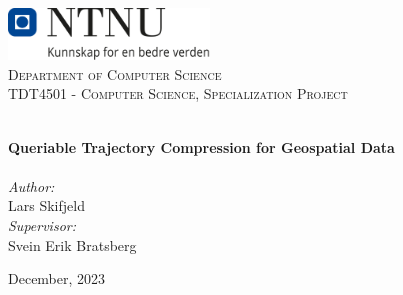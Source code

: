 \begin{titlepage}
    \vbox{ }
    \vbox{ }
    \begin{center}
        \includegraphics[width=0.40\textwidth]{images/NTNU_logo.png}\\[1cm]
        \textsc{\LARGE Department of Computer Science}\\[1.5cm]
        \textsc{\Large TDT4501 - Computer Science, Specialization Project}\\[0.5cm]
        \vbox{ }

        \HRule \\[0.4cm]
        { \huge \bfseries Queriable Trajectory Compression for Geospatial Data}\\[0.4cm]
        \HRule \\[1.5cm]

        \large
        \emph{Author:}\\
        Lars Skifjeld \\
        \emph{Supervisor:}\\
        Svein Erik Bratsberg
        \vfill

        {\large December, 2023}
    \end{center}
\end{titlepage}